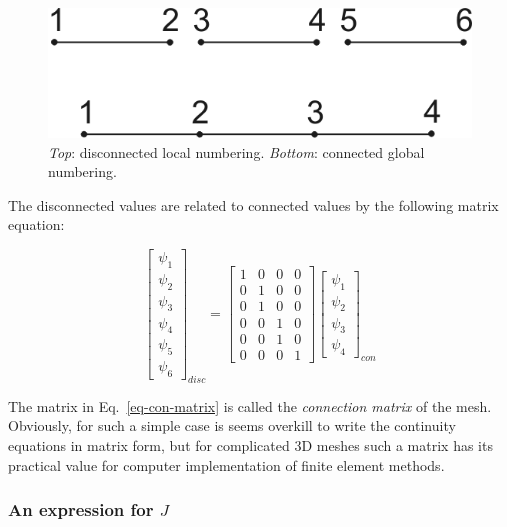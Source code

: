 \begin{figure}
\centering
\includegraphics{numeric/figures/connect}
\caption{\emph{Top}: disconnected local numbering. \emph{Bottom}: connected global numbering.}
\label{fig-connect}
\end{figure}

The disconnected values are related to connected values by the following matrix equation:

\begin{equation}
\begin{bmatrix}
\psi_1 \\ \psi_2 \\ \psi_3 \\ \psi_4 \\ \psi_5 \\ \psi_6
\end{bmatrix}_{disc}
=
\begin{bmatrix}
1 & 0 & 0 & 0  \\ 
0 & 1 & 0 & 0  \\   
0 & 1 & 0 & 0  \\ 
0 & 0 & 1 & 0  \\   
0 & 0 & 1 & 0  \\  
0 & 0 & 0 & 1  
\end{bmatrix}
\begin{bmatrix}
\psi_1 \\ \psi_2 \\ \psi_3 \\ \psi_4
\end{bmatrix}_{con}
\label{eq-con-matrix}
\end{equation} 

The matrix in Eq.~\ref{eq-con-matrix} is called the \emph{connection matrix} of the mesh. Obviously, for such a simple case is seems overkill to write the continuity equations in matrix form, but for complicated 3D meshes such a matrix has its practical value for computer implementation of finite element methods.

\subsubsection{An expression for $J$}

